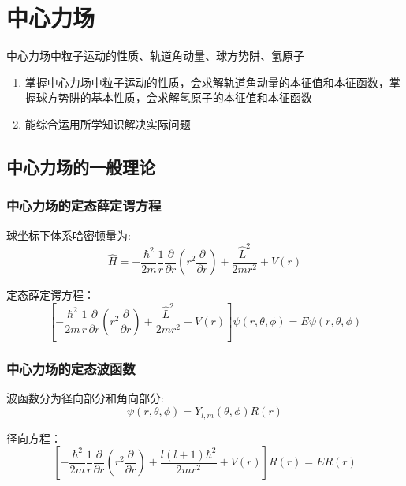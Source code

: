 \documentclass[12pt, a4paper, oneside, UTF8]{ctexbook}
\begin{document}
% 
\else
\fi

\chapter{中心力场}
\begin{examct}{}{}
    中心力场中粒子运动的性质、轨道角动量、球方势阱、氢原子
\end{examct}
\begin{examrqm}{}{}
    \begin{enumerate}
        \item 掌握中心力场中粒子运动的性质，会求解轨道角动量的本征值和本征函数，掌握球方势阱的基本性质，会求解氢原子的本征值和本征函数
        \item 能综合运用所学知识解决实际问题
    \end{enumerate}
\end{examrqm}

\section{中心力场的一般理论}
\subsection{中心力场的定态薛定谔方程}
球坐标下体系哈密顿量为:
\begin{equation}
    \hat{H} = -\frac{\hbar^2}{2m}\frac{1}{r}\frac{\partial}{\partial r} (r^2\frac{\partial}{\partial r})+ \frac{\hat{L}^2}{2mr^2} + V(r) 
\end{equation}

定态薛定谔方程：
\begin{equation}
\left[ -\frac{\hbar^2}{2m}\frac{1}{r}\frac{\partial}{\partial r} (r^2\frac{\partial}{\partial r})+ \frac{\hat{L}^2}{2mr^2} + V(r) \right] \psi(r,\theta,\phi) = E\psi(r,\theta,\phi)
\end{equation}
\subsection{中心力场的定态波函数}
波函数分为径向部分和角向部分:
\begin{equation}
    \psi(r,\theta,\phi) = Y_{l,m}(\theta,\phi)R(r)
\end{equation}

径向方程：
\begin{equation}
    \left[ -\frac{\hbar^2}{2m}\frac{1}{r}\frac{\partial}{\partial r} (r^2\frac{\partial}{\partial r}) + \frac{l(l+1)\hbar^2}{2mr^2} + V(r) \right] R(r) = ER(r)
\end{equation}
\end{document}
